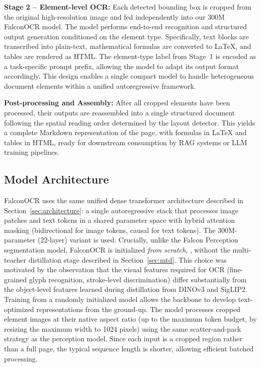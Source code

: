 \noindent \textbf{Stage 2 -- Element-level OCR:} Each detected bounding box is cropped from the original high-resolution image and fed independently into our 300M FalconOCR model. The model performs end-to-end recognition and structured output generation conditioned on the element type. Specifically, text blocks are transcribed into plain-text, mathematical formulas are converted to \LaTeX{}, and tables are rendered as HTML. The element-type label from Stage~1 is encoded as a task-specific prompt prefix, allowing the model to adapt its output format accordingly. This design enables a single compact model to handle heterogeneous document elements within a unified autoregressive framework.

\noindent \textbf{Post-processing and Assembly:} After all cropped elements have been processed, their outputs are reassembled into a single structured document following the spatial reading order determined by the layout detector. This yields a complete Markdown representation of the page, with formulas in \LaTeX{} and tables in HTML, ready for downstream consumption by RAG systems or LLM training pipelines.

\subsection{Model Architecture}

FalconOCR uses the same unified dense transformer architecture described in Section~\ref{sec:architecture}: a single autoregressive stack that processes image patches and text tokens in a shared parameter space with hybrid attention masking (bidirectional for image tokens, causal for text tokens). The 300M-parameter (22-layer) variant is used. Crucially, unlike the Falcon Perception segmentation model, FalconOCR is initialized \textit{from scratch}, \ie, without the multi-teacher distillation stage described in Section~\ref{sec:mtd}. This choice was motivated by the observation that the visual features required for OCR (fine-grained glyph recognition, stroke-level discrimination) differ substantially from the object-level features learned during distillation from DINOv3 and SigLIP2. Training from a randomly initialized model allows the backbone to develop text-optimized representations from the ground-up.
The model processes cropped element images at their native aspect ratio (up to the maximum token budget, by resizing the maximum width to 1024 pixels) using the same scatter-and-pack strategy as the perception model. Since each input is a cropped region rather than a full page, the typical sequence length is shorter, allowing efficient batched processing.

